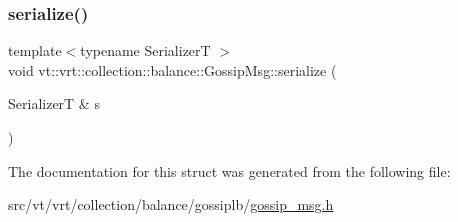 \subsubsection{\texorpdfstring{serialize()}{serialize()}}
{\footnotesize\ttfamily template$<$typename SerializerT $>$ \\
void vt\+::vrt\+::collection\+::balance\+::\+Gossip\+Msg\+::serialize (\begin{DoxyParamCaption}\item[{SerializerT \&}]{s }\end{DoxyParamCaption})\hspace{0.3cm}{\ttfamily [inline]}}



The documentation for this struct was generated from the following file\+:\begin{DoxyCompactItemize}
\item 
src/vt/vrt/collection/balance/gossiplb/\hyperlink{gossip__msg_8h}{gossip\+\_\+msg.\+h}\end{DoxyCompactItemize}
